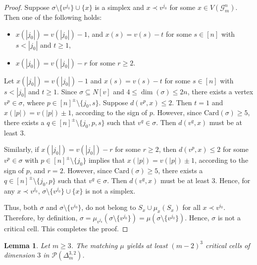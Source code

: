 \documentclass{amsart}
\newtheorem{lemma}[theorem]{Lemma}
\theoremstyle{definition}
\theoremstyle{remark}
\numberwithin{equation}{section}
\newcommand{\D}{\Delta}
\newcommand{\cP}{\mathcal{P}}
\begin{document}
\begin{proof}
	Suppose $\sigma \setminus \{v^{j_0}\} \cup \{x\}$ is a simplex and $x \prec v^{j_0}$ for some $x \in V(\mathcal{G}_m^n)$. Then one of the following holds:
	\begin{itemize}
		\item $x(|j_0|) = v(|j_0|) - 1$, and $x(s) = v(s) - t$ for some $s \in [n]$ with $s < |j_0|$ and $t \geq 1$,
		\item $x(|j_0|) = v(|j_0|) - r$ for some $r \geq 2$.
	\end{itemize}
	
	Let $x(|j_0|) = v(|j_0|) - 1$ and $x(s) = v(s) - t$ for some $s \in [n]$ with $s < |j_0|$ and $t \geq 1$.
Since $\sigma \subseteq N[v]$ and $4 \leq \dim(\sigma) \leq 2n$, there exists a vertex $v^{p} \in \sigma$, where $p \in [n]^{\pm} \setminus \{j_0, s\}$. Suppose $d(v^{p}, x) \leq 2$. Then $t=1$ and $x(|p|) = v(|p|) \pm 1$, according to the sign of $p$. However, since $\mathrm{Card}(\sigma) \geq 5$, there exists a $q \in [n]^{\pm} \setminus \{j_0, p, s\}$ such that $v^{q} \in \sigma$. Then $d(v^{q}, x)$ must be at least $3$.

Similarly, if $x(|j_0|) = v(|j_0|) - r$ for some $r \geq 2$, then $d(v^{p}, x) \leq 2$ for some $v^{p} \in \sigma$ with $p \in [n]^{\pm} \setminus \{j_0\}$ implies that $x(|p|) = v(|p|) \pm 1$, according to the sign of $p$, and $r = 2$. However, since $\mathrm{Card}(\sigma) \geq 5$, there exists a $q \in [n]^{\pm} \setminus \{j_0, p\}$ such that $v^{q} \in \sigma$. Then $d(v^{q}, x)$ must be at least $3$.    Hence, for any $x \prec v^{j_0}$, $\sigma \setminus \{v^{j_0}\} \cup \{x\}$ is not a simplex.
	
	Thus, both $\sigma $ and $\sigma \setminus \{v^{i_0}\}$, do not belong to  $S_x \cup \mu_x(S_x)$ for all $x \prec v^{i_0}$. Therefore, by definition, $\sigma = \mu_{v^{j_0}}(\sigma \setminus \{v^{j_0}\}) = \mu(\sigma \setminus \{v^{j_0}\})$. Hence, $\sigma$ is not a critical cell. This completes the proof. 
\end{proof}





\begin{lemma}\label{lemma:3_critical_cells}
	Let $m\geq 3$. The matching $\mu$ yields at least $(m-2)^3$ critical cells of dimension $3$ in $\cP(\D_m^{3,2})$.
\end{lemma}
\end{document}
